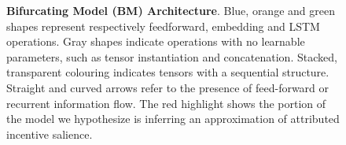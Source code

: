 \begin{figure}[ht]
\begin{center}
\begin{adjustbox}{width=0.5\textwidth}
\begin{tikzpicture}[x=0.75pt,y=0.75pt,yscale=-1,xscale=1]
\end{tikzpicture}

\end{adjustbox}
\end{center}
\caption{\textbf{Bifurcating Model (BM) Architecture}. Blue, orange and green shapes represent respectively feedforward, embedding and LSTM operations. Gray shapes indicate operations with no learnable parameters, such as tensor instantiation and concatenation. Stacked, transparent colouring indicates tensors with a sequential structure. Straight and curved arrows refer to the presence of feed-forward or recurrent information flow. The red highlight shows the portion of the model we hypothesize is inferring an approximation of attributed incentive salience.}
\label{fig: rnn_1}
\end{figure}